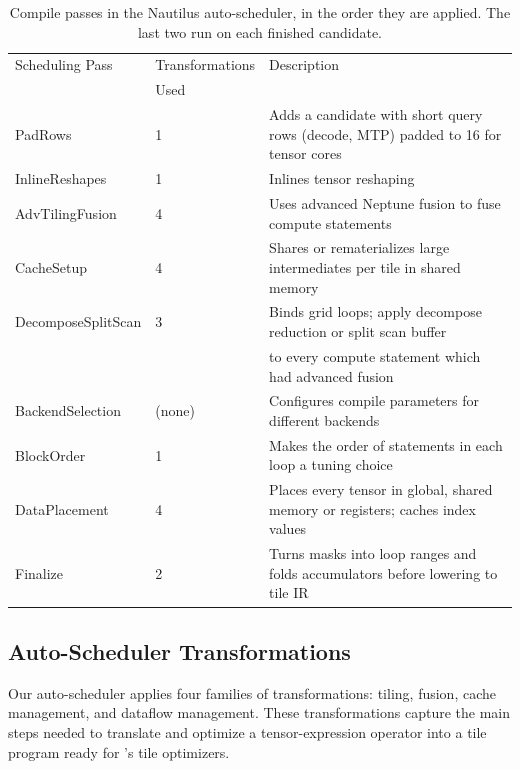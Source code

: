 \begin{table}[t]
  \centering
  \small
  \caption{Compile passes in the Nautilus auto-scheduler, in the order they are applied.
    The last two run on
  each finished candidate.}
  \label{tab:passes}
  \begin{tabular}{lll}
    \hline
    Scheduling Pass & Transformations & Description \\
    & Used & \\
    \hline
    PadRows            & 1                & Adds a candidate with short query rows
    (decode, MTP) padded to 16 for tensor cores \\
    InlineReshapes     & 1                & Inlines tensor reshaping \\
    AdvTilingFusion    & 4   & Uses advanced Neptune fusion to fuse compute statements \\
    CacheSetup         & 4  & Shares or rematerializes large intermediates per tile in
    shared memory \\
    DecomposeSplitScan & 3      & Binds grid loops; apply decompose reduction or split
    scan buffer \\
    & & to every compute statement which had advanced fusion \\
    BackendSelection   & (none)            & Configures compile parameters for different backends \\
    BlockOrder         & 1                & Makes the order of statements in each loop a
    tuning choice \\
    DataPlacement      & 4   & Places every tensor in global, shared memory or registers;
    caches index values \\
    Finalize           & 2          & Turns masks into loop ranges and folds accumulators
    before lowering to tile IR \\
    \hline
  \end{tabular}
\end{table}

\subsection{Auto-Scheduler Transformations}
Our auto-scheduler applies four families of transformations:
tiling, fusion, cache management, and dataflow management.
These transformations capture the main steps needed to translate
and optimize a tensor-expression operator into a tile program ready for \NAME{}'s tile optimizers.

